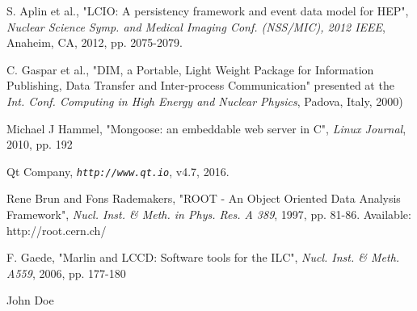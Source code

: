 \documentclass[conference]{IEEEtran}
\begin{document}
\begin{thebibliography}{1}

S. Aplin et al., "LCIO: A persistency framework and event data model for HEP", \emph{Nuclear Science Symp. and Medical Imaging Conf. (NSS/MIC), 2012 IEEE}, Anaheim, CA, 2012, pp. 2075-2079.

C. Gaspar et al., "DIM, a Portable, Light Weight Package for Information Publishing, Data Transfer and Inter-process Communication" presented at the \emph{Int. Conf. Computing in High Energy and Nuclear Physics}, Padova, Italy, 2000)

Michael J Hammel, "Mongoose: an embeddable web server in C", \emph{Linux Journal}, 2010, pp. 192

Qt Company, \emph{\tt http://www.qt.io}, v4.7, 2016.

Rene Brun and Fons Rademakers, "ROOT - An Object Oriented Data Analysis Framework", \emph{Nucl. Inst. \& Meth. in Phys. Res. A 389}, 1997, pp. 81-86. Available: http://root.cern.ch/

F. Gaede,  "Marlin and LCCD: Software tools for the ILC", \emph{Nucl. Inst. \& Meth. A559}, 2006, pp. 177-180

\end{thebibliography}


%

\begin{IEEEbiography}{John Doe}
\blindtext
\end{IEEEbiography}









\end{document}
